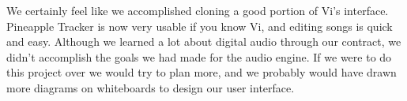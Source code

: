 \documentclass[12pt,letterpaper]{article}
\begin{document}
\par
We certainly feel like we accomplished cloning a good portion of Vi's interface.
Pineapple Tracker is now very usable if you know Vi, and editing songs is quick and easy.
Although we learned a lot about digital audio through our contract, we didn't accomplish the goals we had made for the audio engine.
If we were to do this project over we would try to plan more, and we probably would have drawn more diagrams on whiteboards to design our user interface.
\end{document}
